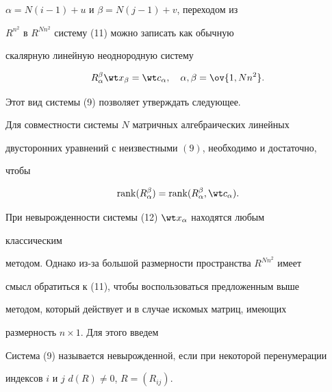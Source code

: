 $\alpha=N(i-1)+u$ и $\beta=N(j-1)+v$, переходом из 


$R^{n^2}$ в $R^{Nn^2}$ систему (11) можно записать как обычную 


скалярную линейную неоднородную систему 


\begin{equation} 


R_\alpha^\beta\wt x_\beta=\wt c_\alpha,\quad 


\alpha,\beta=\ov{1,Nn^2}. 


\end{equation} 


 


Этот вид системы (9) позволяет утверждать следующее. 


 


\begin{thm} 


Для совместности системы $N$ матричных алгебраических линейных 


двусторонних уравнений с неизвестными $(9)$, необходимо и достаточно, 


чтобы


$$


\rank(R^\beta_\alpha)=\rank(R^\beta_\alpha,\wt c_\alpha). 


$$


\end{thm} 


 


При невырожденности системы (12) $\wt x_\alpha$ находятся любым 


классическим 


методом. Однако из-за большой размерности пространства $R^{Nn^2}$ имеет 


смысл обратиться к (11), чтобы воспользоваться предложенным выше 


методом, который действует и в случае искомых матриц, имеющих 


размерность $n\times 1$. Для этого введем 


 


\begin{defn} 


Система (9) называется невырожденной, если при некоторой перенумерации 


индексов $i$ и $j$\; $d(R)\ne 0$, $R=(R_{ij})$. 


\end{defn} 


